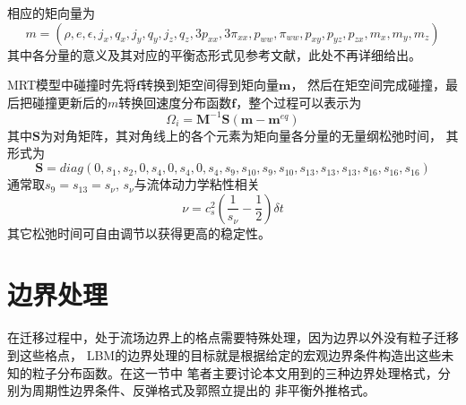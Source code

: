 \renewcommand{\baselinestretch}{1.5}
相应的矩向量为
\begin{displaymath}
 m=(\rho, e, \epsilon, j_x, q_x, j_y, q_y, j_z, q_z, 
3p_{xx}, 3\pi_{xx},p_{ww},\pi_{ww},p_{xy}, p_{yz}, p_{zx},m_x, m_y, m_z)
\end{displaymath}
其中各分量的意义及其对应的平衡态形式见参考文献\cite{pan2006evaluation}，此处不再详细给出。


MRT模型中碰撞时先将$\bm f$转换到矩空间得到矩向量$\bm m$，
然后在矩空间完成碰撞，最后把碰撞更新后的$m$转换回速度分布函数$\bm f$，整个过程可以表示为
\begin{equation}
\Omega_i = \bm M^{-1} \bm S(\bm m - \bm m^{eq})
\end{equation}
其中$\bm S$为对角矩阵，其对角线上的各个元素为矩向量各分量的无量纲松弛时间， 其形式为
\begin{displaymath}
\bm S = diag(0,s_1,s_2,0,s_4, 0, s_4, 0, s_4, s_9, s_10, s_9, s_{10}, s_{13}, s_{13}, s_{13}, s_{16}, s_{16}, s_{16})
\end{displaymath}
通常取$s_9=s_{13}=s_\nu$, $s_\nu$与流体动力学粘性相关
\begin{equation}
\nu = c_s^2(\frac{1}{s_\nu}-\frac{1}{2})\delta t
\end{equation}
其它松弛时间可自由调节以获得更高的稳定性。


\section{边界处理}
在迁移过程中，处于流场边界上的格点需要特殊处理，因为边界以外没有粒子迁移到这些格点，
LBM的边界处理的目标就是根据给定的宏观边界条件构造出这些未知的粒子分布函数。在这一节中
笔者主要讨论本文用到的三种边界处理格式，分别为周期性边界条件、反弹格式及郭照立提出的
非平衡外推格式。

